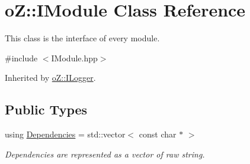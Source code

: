 \hypertarget{classo_z_1_1_i_module}{}\section{oZ\+::I\+Module Class Reference}
\label{classo_z_1_1_i_module}


This class is the interface of every module.  




{\ttfamily \#include $<$I\+Module.\+hpp$>$}



Inherited by \mbox{\hyperlink{classo_z_1_1_i_logger}{o\+Z\+::\+I\+Logger}}.

\subsection*{Public Types}
\begin{DoxyCompactItemize}
\item 
using \mbox{\hyperlink{classo_z_1_1_i_module_ac13210556cb2a65d186bfbe5208c666c}{Dependencies}} = std\+::vector$<$ const char $\ast$ $>$
\begin{DoxyCompactList}\small\item\em Dependencies are represented as a vector of raw string. \end{DoxyCompactList}\end{DoxyCompactItemize}
